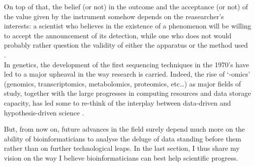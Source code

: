 On top of that, the belief (or not) in the outcome and the acceptance (or not) of the value given by the instrument somehow depends on the reasearcher's interests: a scientist who believes in the existence of a phenomenon will be willing to accept the announcement of its detection, while one who does not would probably rather question the validity of either the apparatus or the method used \citep{gingras2017determinants}.\\


In genetics, the development of the first sequencing techniques in the 1970's have led to a major upheaval in the way research is carried.
Indeed, the rise of ‘-omics’ (genomics, transcriptomics, metabolomics, proteomics, etc…) as major fields of study, together with the large progresses in computing resources and data storage capacity, has led some to re-think of the interplay between data-driven and hypothesis-driven science \citep{kell2004here, mazzocchi2015could}.

But, from now on, future advances in the field surely depend much more on the ability of bioinformaticians to analyse the deluge of data standing before them rather than on further technological leaps.
In the last section, I thus share my vision on the way I believe bioinformaticians can best help scientific progress.




